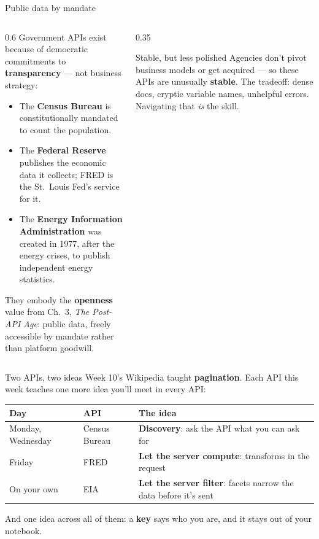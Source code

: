 \documentclass[9pt,aspectratio=169]{beamer}
\begin{document}
\begin{frame}{Public data by mandate}
    \begin{columns}[T]
        \begin{column}{0.6\textwidth}
            Government APIs exist because of democratic commitments to \textbf{transparency} --- not business strategy:
            \begin{itemize}\small
                \item The \textbf{Census Bureau} is constitutionally mandated to count the population.
                \item The \textbf{Federal Reserve} publishes the economic data it collects; FRED is the St.\ Louis Fed's service for it.
                \item The \textbf{Energy Information Administration} was created in 1977, after the energy crises, to publish independent energy statistics.
            \end{itemize}

            \medskip

            They embody the \textbf{openness} value from Ch.~3, \textit{The Post-API Age}: public data, freely accessible by mandate rather than platform goodwill.
        \end{column}
        \begin{column}{0.35\textwidth}
            \begin{alertblock}{Stable, but less polished}
                \footnotesize Agencies don't pivot business models or get acquired --- so these APIs are unusually \textbf{stable}. The tradeoff: dense docs, cryptic variable names, unhelpful errors. Navigating that \textit{is} the skill.
            \end{alertblock}
        \end{column}
    \end{columns}
\end{frame}

\begin{frame}{Two APIs, two ideas}
    Week 10's Wikipedia taught \textbf{pagination}. Each API this week teaches one more idea you'll meet in every API:

    \medskip
    \begin{center}\small
    \begin{tabular}{@{}lll@{}}
        \toprule
        \textbf{Day} & \textbf{API} & \textbf{The idea} \\
        \midrule
        Monday, Wednesday & Census Bureau & \textbf{Discovery}: ask the API what you can ask for \\
        Friday & FRED & \textbf{Let the server compute}: transforms in the request \\
        \midrule
        On your own & EIA & \textbf{Let the server filter}: facets narrow the data before it's sent \\
        \bottomrule
    \end{tabular}
    \end{center}

    \medskip
    And one idea across all of them: a \textbf{key} says who you are, and it stays out of your notebook.
\end{frame}
\end{document}
